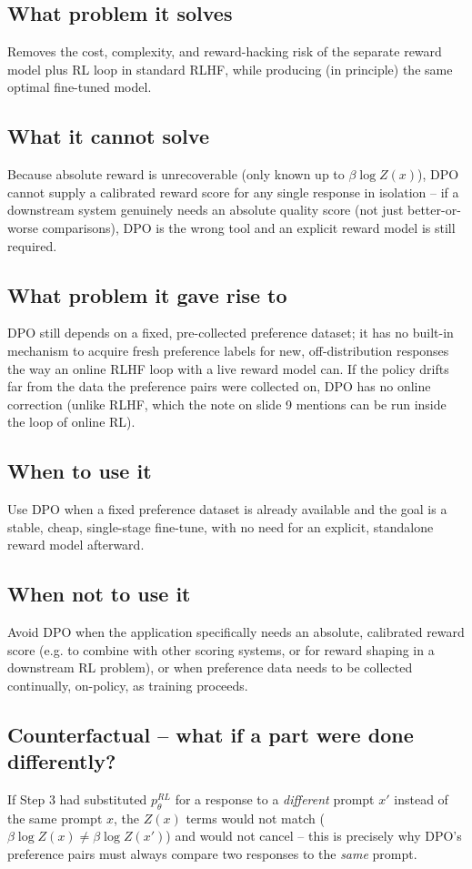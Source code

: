 \documentclass[11pt]{article}
\begin{document}
\subsection{What problem it solves}
Removes the cost, complexity, and reward-hacking risk of the separate reward
model plus RL loop in standard RLHF, while producing (in principle) the same
optimal fine-tuned model.

\subsection{What it cannot solve}
Because absolute reward is unrecoverable (only known up to $\beta\log Z(x)$), DPO
cannot supply a calibrated reward score for any single response in isolation --
if a downstream system genuinely needs an absolute quality score (not just
better-or-worse comparisons), DPO is the wrong tool and an explicit reward model
is still required.

\subsection{What problem it gave rise to}
DPO still depends on a fixed, pre-collected preference dataset; it has no
built-in mechanism to acquire fresh preference labels for new, off-distribution
responses the way an online RLHF loop with a live reward model can. If the
policy drifts far from the data the preference pairs were collected on, DPO has
no online correction (unlike RLHF, which the note on slide 9 mentions can be run
inside the loop of online RL).

\subsection{When to use it}
Use DPO when a fixed preference dataset is already available and the goal is a
stable, cheap, single-stage fine-tune, with no need for an explicit, standalone
reward model afterward.

\subsection{When not to use it}
Avoid DPO when the application specifically needs an absolute, calibrated reward
score (e.g. to combine with other scoring systems, or for reward shaping in a
downstream RL problem), or when preference data needs to be collected
continually, on-policy, as training proceeds.

\subsection{Counterfactual -- what if a part were done differently?}
If Step 3 had substituted $p^{RL}_\theta$ for a response to a \emph{different}
prompt $x'$ instead of the same prompt $x$, the $Z(x)$ terms would not match
($\beta\log Z(x) \ne \beta\log Z(x')$) and would not cancel -- this is precisely
why DPO's preference pairs must always compare two responses to the \emph{same}
prompt.
\end{document}
